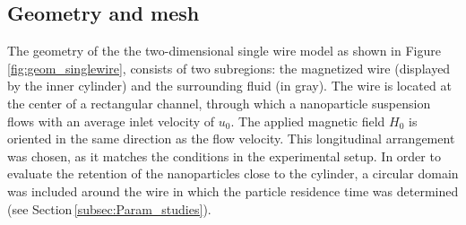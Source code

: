 \subsection{Geometry and mesh}
\label{subsec:geom}
The geometry of the the two-dimensional single wire model as shown in Figure\,\ref{fig:geom_singlewire}, consists of two subregions: the magnetized wire (displayed by the inner cylinder) and the surrounding fluid (in gray). The wire is located at the center of a rectangular channel, through which a nanoparticle suspension flows with an average inlet velocity of $u_{0}$. The applied magnetic field $H_{0}$ is oriented in the same direction as the flow velocity. This longitudinal arrangement was chosen, as it matches the conditions in the experimental setup. In order to evaluate the retention of the nanoparticles close to the cylinder, a circular domain was included around the wire in which the particle residence time was determined (see Section\,\ref{subsec:Param_studies}).

\begin{figure}[H]
\centering
{}
\end{figure}

